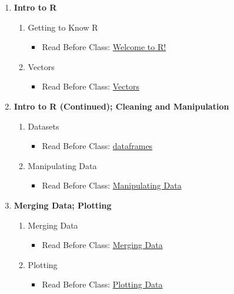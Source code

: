 \documentclass[12pt]{article}
\begin{document}
\begin{enumerate}[label=\textbf{Week \arabic*:}]
	\item \textbf{Intro to R}
	\begin{enumerate}[label=Class \arabic*:]
		\item Getting to Know R
		\begin{itemize}
			\item Read Before Class: \href{https://learnr4ds.com/html/introduction.html}{Welcome to R!}
		\end{itemize}
		\item Vectors
		\begin{itemize}
			\item Read Before Class: \href{https://learnr4ds.com/html/vectors.html}{Vectors}
		\end{itemize}
	\end{enumerate}

	\item \textbf{Intro to R (Continued); Cleaning and Manipulation}
	\begin{enumerate}[label=Class \arabic*:]
		\item Datasets
		\begin{itemize}
			\item Read Before Class: \href{https://learnr4ds.com/html/dataset-basics.html}{dataframes}
		\end{itemize}
		\item Manipulating Data
		\begin{itemize}
			\item Read Before Class: \href{https://learnr4ds.com/html/modifying-data.html}{Manipulating Data}
		\end{itemize}
	\end{enumerate}

	\item \textbf{Merging Data; Plotting}
	\begin{enumerate}[label=Class \arabic*:]
		\item Merging Data
		\begin{itemize}
			\item Read Before Class: \href{https://learnr4ds.com/html/merging-appending.html}{Merging Data}
		\end{itemize}
		\item Plotting
		\begin{itemize}
			\item Read Before Class: \href{https://learnr4ds.com/html/plotting.html}{Plotting Data}
		\end{itemize}
	\end{enumerate}


\end{enumerate}
\end{document}
